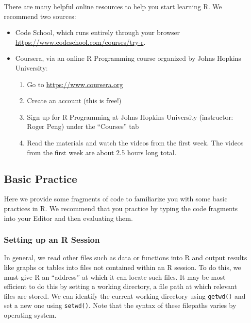 \documentclass[12pt,]{book}
\providecommand{\tightlist}{%
  \setlength{\itemsep}{0pt}\setlength{\parskip}{0pt}}
\begin{document}
There are many helpful online resources to help you start learning R. We recommend two sources:

\begin{itemize}
\tightlist
\item
  Code School, which runs entirely through your browser \url{https://www.codeschool.com/courses/try-r}.
\item
  Coursera, via an online R Programming course organized by Johns Hopkins University:

  \begin{enumerate}
  \def\labelenumi{\roman{enumi}.}
  \tightlist
  \item
    Go to \url{https://www.coursera.org}
  \item
    Create an account (this is free!)
  \item
    Sign up for R Programming at Johns Hopkins University (instructor: Roger Peng) under the ``Courses'' tab
  \item
    Read the materials and watch the videos from the first week. The videos from the first week are about 2.5 hours long total.
  \end{enumerate}
\end{itemize}

\hypertarget{basic-practice}{%
\subsection{Basic Practice}\label{basic-practice}}

Here we provide some fragments of code to familiarize you with some basic practices in R. We recommend that you practice by typing the code fragments into your Editor and then evaluating them.

\hypertarget{setting-up-an-r-session}{%
\subsubsection{Setting up an R Session}\label{setting-up-an-r-session}}

In general, we read other files such as data or functions into R and output results like graphs or tables into files not contained within an R session. To do this, we must give R an ``address'' at which it can locate such files. It may be most efficient to do this by setting a working directory, a file path at which relevant files are stored. We can identify the current working directory using \texttt{getwd()} and set a new one using \texttt{setwd()}. Note that the syntax of these filepaths varies by operating system.
\end{document}
